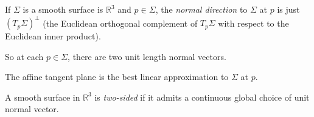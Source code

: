 \begin{definition}{}{}
    If \(\Sigma\) is a smooth surface is \(\mathbb{R}^3\) and \(p\in \Sigma\), the \textit{normal direction} to \(\Sigma\) at \(p\) is just \((T_p\Sigma)^{\perp}\) (the Euclidean orthogonal complement of \(T_p\Sigma\) with respect to the Euclidean inner product).

    So at each \(p \in \Sigma\), there are two unit length normal vectors.
\end{definition}
The affine tangent plane is the best linear approximation to \(\Sigma\) at \(p\).
\begin{definition}{}{}
    A smooth surface in \(\mathbb{R}^3\) is \textit{two-sided} if it admits a continuous global choice of unit normal vector.
\end{definition}